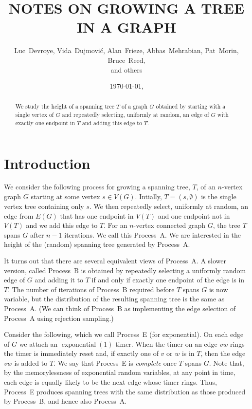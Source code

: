\documentclass[lotsofwhite]{patmorin}
\date{\today, \currenttime}
\title{\MakeUppercase{Notes on Growing a Tree in a Graph}}
\author{
   Luc~Devroye,
   Vida~Dujmovi\'c,
   Alan~Frieze,
   Abbas~Mehrabian,
   Pat~Morin,
   Bruce~Reed,\\
   and others
}
\DeclareMathOperator{\exponential}{exponential}
\begin{document}
\maketitle

\begin{abstract}
We study the height of a spanning tree $T$ of a graph $G$ obtained by
starting with a single vertex of $G$ and repeatedly selecting, uniformly
at random, an edge of $G$ with exactly one endpoint in $T$ and adding
this edge to $T$.
\end{abstract}

\tableofcontents
\newpage

\section{Introduction}

We consider the following process for growing a spanning tree, $T$, of
an $n$-vertex graph $G$ starting at some vertex $s\in V(G)$.  Intially,
$T=(s,\emptyset)$ is the single vertex tree containing only $s$. We then
repeatedly select, uniformly at random, an edge from $E(G)$ that has one
endpoint in $V(T)$ and one endpoint not in $V(T)$ and we add this edge
to $T$.  For an $n$-vertex connected graph $G$, the tree $T$ spans $G$
after $n-1$ iterations.  We call this Process~A.  We are interested in
the height of the (random) spanning tree generated by Process~A.

It turns out that there are several equivalent views of Process~A.
A slower version, called Process~B is obtained by repeatedly selecting
a uniformly random edge of $G$ and adding it to $T$ if and only if
exactly one endpoint of the edge is in $T$.  The number of iterations
of Process~B required before $T$ spans $G$ is now variable, but the
distribution of the resulting spanning tree is the same as Process~A.
(We can think of Process~B as implementing the edge selection of Process~A
using rejection sampling.)

Consider the following, which we call Process~E (for exponential).
On each edge of $G$ we attach an $\exponential(1)$ timer.  When the
timer on an edge $vw$ rings the timer is immediately reset and, if
exactly one of $v$ or $w$ is in $T$, then the edge $vw$ is added to $T$.
We say that Process~E is \emph{complete} once $T$ spans $G$.  Note that,
by the memorylessness of exponential random variables, at any point in
time, each edge is equally likely to be the next edge whose timer rings.
Thus, Process~E produces spanning trees with the same distribution as
those produced by Process~B, and hence also Process~A.
\end{document}
